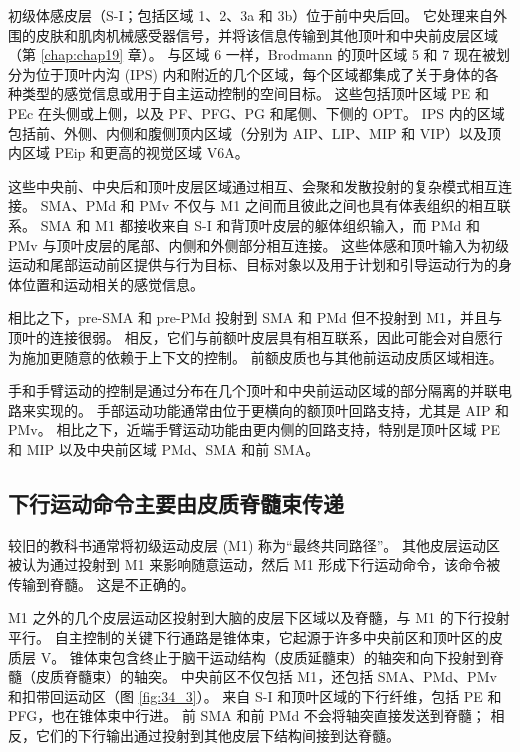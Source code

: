 初级体感皮层（S-I；包括区域 1、2、3a 和 3b）位于前中央后回。 它处理来自外围的皮肤和肌肉机械感受器信号，并将该信息传输到其他顶叶和中央前皮层区域（第 \ref{chap:chap19} 章）。 与区域 6 一样，Brodmann 的顶叶区域 5 和 7 现在被划分为位于顶叶内沟 (IPS) 内和附近的几个区域，每个区域都集成了关于身体的各种类型的感觉信息或用于自主运动控制的空间目标。 这些包括顶叶区域 PE 和 PEc 在头侧或上侧，以及 PF、PFG、PG 和尾侧、下侧的 OPT。 IPS 内的区域包括前、外侧、内侧和腹侧顶内区域（分别为 AIP、LIP、MIP 和 VIP）以及顶内区域 PEip 和更高的视觉区域 V6A。

这些中央前、中央后和顶叶皮层区域通过相互、会聚和发散投射的复杂模式相互连接。 SMA、PMd 和 PMv 不仅与 M1 之间而且彼此之间也具有体表组织的相互联系。 SMA 和 M1 都接收来自 S-I 和背顶叶皮层的躯体组织输入，而 PMd 和 PMv 与顶叶皮层的尾部、内侧和外侧部分相互连接。 这些体感和顶叶输入为初级运动和尾部运动前区提供与行为目标、目标对象以及用于计划和引导运动行为的身体位置和运动相关的感觉信息。

相比之下，pre-SMA 和 pre-PMd 投射到 SMA 和 PMd 但不投射到 M1，并且与顶叶的连接很弱。 相反，它们与前额叶皮层具有相互联系，因此可能会对自愿行为施加更随意的依赖于上下文的控制。 前额皮质也与其他前运动皮质区域相连。

手和手臂运动的控制是通过分布在几个顶叶和中央前运动区域的部分隔离的并联电路来实现的。 手部运动功能通常由位于更横向的额顶叶回路支持，尤其是 AIP 和 PMv。 相比之下，近端手臂运动功能由更内侧的回路支持，特别是顶叶区域 PE 和 MIP 以及中央前区域 PMd、SMA 和前 SMA。




\subsection{下行运动命令主要由皮质脊髓束传递}
较旧的教科书通常将初级运动皮层 (M1) 称为“最终共同路径”。 其他皮层运动区被认为通过投射到 M1 来影响随意运动，然后 M1 形成下行运动命令，该命令被传输到脊髓。 这是不正确的。

M1 之外的几个皮层运动区投射到大脑的皮层下区域以及脊髓，与 M1 的下行投射平行。 自主控制的关键下行通路是锥体束，它起源于许多中央前区和顶叶区的皮质层 V。 锥体束包含终止于脑干运动结构（皮质延髓束）的轴突和向下投射到脊髓（皮质脊髓束）的轴突。 
中央前区不仅包括 M1，还包括 SMA、PMd、PMv 和扣带回运动区（图 \ref{fig:34_3}）。
来自 S-I 和顶叶区域的下行纤维，包括 PE 和 PFG，也在锥体束中行进。 前 SMA 和前 PMd 不会将轴突直接发送到脊髓； 相反，它们的下行输出通过投射到其他皮层下结构间接到达脊髓。

